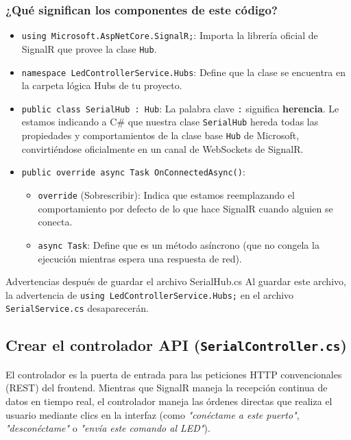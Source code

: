 \documentclass[
10pt, %
a4paper, %
oneside, %
headinclude,footinclude, %
BCOR5mm, %
]{scrartcl}
\begin{document}
\subsubsection{¿Qué significan los componentes de este código?}
\begin{itemize}
	\item \texttt{using Microsoft.AspNetCore.SignalR;}: Importa la librería oficial de SignalR que provee la clase \texttt{Hub}.
	\item \texttt{namespace LedControllerService.Hubs}: Define que la clase se encuentra en la carpeta lógica Hubs de tu proyecto.
	\item \texttt{public class SerialHub : Hub}: La palabra clave \texttt{:} significa \textbf{herencia}. Le estamos indicando a C\# que nuestra clase \texttt{SerialHub} hereda todas las propiedades y comportamientos de la clase base \texttt{Hub} de Microsoft, convirtiéndose oficialmente en un canal de WebSockets de SignalR.
	\item \texttt{public override async Task OnConnectedAsync()}:
	\begin{itemize}
		\item \texttt{override} (Sobrescribir): Indica que estamos reemplazando el comportamiento por defecto de lo que hace SignalR cuando alguien se conecta.
		\item \texttt{async Task}: Define que es un método asíncrono (que no congela la ejecución mientras espera una respuesta de red).
	\end{itemize} 
\end{itemize}

\begin{InfoBox}{Advertencias después de guardar el archivo SerialHub.cs } 
	Al guardar este archivo, la advertencia de \texttt{using LedControllerService.Hubs;} en el archivo \texttt{SerialService.cs} desaparecerán.
\end{InfoBox}

\newpage
\subsection{Crear el controlador API (\texttt{SerialController.cs})}

El controlador es la puerta de entrada para las peticiones HTTP convencionales (REST) del frontend. Mientras que SignalR maneja la recepción continua de datos en tiempo real, el controlador maneja las órdenes directas que realiza el usuario mediante clics en la interfaz (como \textit{"conéctame a este puerto"}, \textit{"desconéctame"} o \textit{"envía este comando al LED"}).
\end{document}
